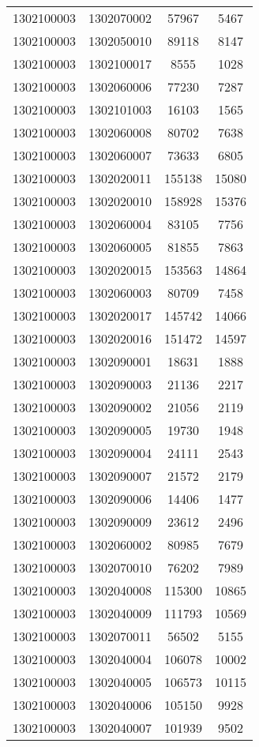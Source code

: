 \begin{longtable}{llcc}
1302100003 & 1302070002 & 57967 & 5467\\
1302100003 & 1302050010 & 89118 & 8147\\
1302100003 & 1302100017 & 8555 & 1028\\
1302100003 & 1302060006 & 77230 & 7287\\
1302100003 & 1302101003 & 16103 & 1565\\
1302100003 & 1302060008 & 80702 & 7638\\
1302100003 & 1302060007 & 73633 & 6805\\
1302100003 & 1302020011 & 155138 & 15080\\
1302100003 & 1302020010 & 158928 & 15376\\
1302100003 & 1302060004 & 83105 & 7756\\
1302100003 & 1302060005 & 81855 & 7863\\
1302100003 & 1302020015 & 153563 & 14864\\
1302100003 & 1302060003 & 80709 & 7458\\
1302100003 & 1302020017 & 145742 & 14066\\
1302100003 & 1302020016 & 151472 & 14597\\
1302100003 & 1302090001 & 18631 & 1888\\
1302100003 & 1302090003 & 21136 & 2217\\
1302100003 & 1302090002 & 21056 & 2119\\
1302100003 & 1302090005 & 19730 & 1948\\
1302100003 & 1302090004 & 24111 & 2543\\
1302100003 & 1302090007 & 21572 & 2179\\
1302100003 & 1302090006 & 14406 & 1477\\
1302100003 & 1302090009 & 23612 & 2496\\
1302100003 & 1302060002 & 80985 & 7679\\
1302100003 & 1302070010 & 76202 & 7989\\
1302100003 & 1302040008 & 115300 & 10865\\
1302100003 & 1302040009 & 111793 & 10569\\
1302100003 & 1302070011 & 56502 & 5155\\
1302100003 & 1302040004 & 106078 & 10002\\
1302100003 & 1302040005 & 106573 & 10115\\
1302100003 & 1302040006 & 105150 & 9928\\
1302100003 & 1302040007 & 101939 & 9502\\

\end{longtable}
